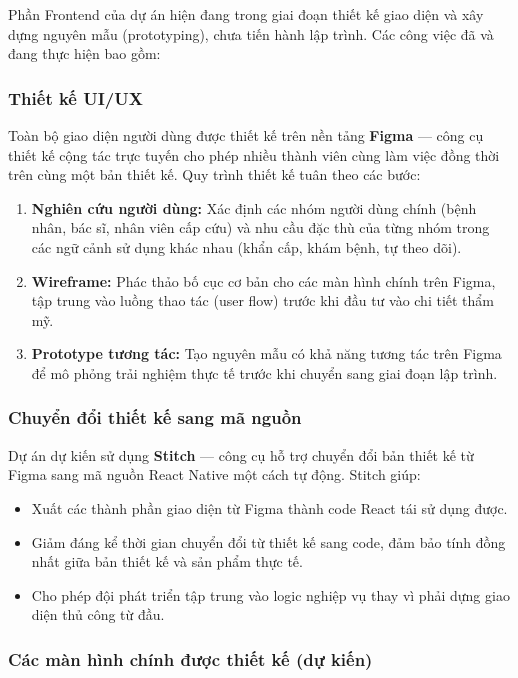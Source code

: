 \documentclass[a4paper,12pt]{article}
\begin{document}
Phần Frontend của dự án hiện đang trong giai đoạn thiết kế giao diện và xây dựng nguyên mẫu (prototyping), chưa tiến hành lập trình. Các công việc đã và đang thực hiện bao gồm:

\subsubsection{Thiết kế UI/UX}

Toàn bộ giao diện người dùng được thiết kế trên nền tảng \textbf{Figma} --- công cụ thiết kế cộng tác trực tuyến cho phép nhiều thành viên cùng làm việc đồng thời trên cùng một bản thiết kế. Quy trình thiết kế tuân theo các bước:

\begin{enumerate}
    \item \textbf{Nghiên cứu người dùng:} Xác định các nhóm người dùng chính (bệnh nhân, bác sĩ, nhân viên cấp cứu) và nhu cầu đặc thù của từng nhóm trong các ngữ cảnh sử dụng khác nhau (khẩn cấp, khám bệnh, tự theo dõi).
    \item \textbf{Wireframe:} Phác thảo bố cục cơ bản cho các màn hình chính trên Figma, tập trung vào luồng thao tác (user flow) trước khi đầu tư vào chi tiết thẩm mỹ.
    \item \textbf{Prototype tương tác:} Tạo nguyên mẫu có khả năng tương tác trên Figma để mô phỏng trải nghiệm thực tế trước khi chuyển sang giai đoạn lập trình.
\end{enumerate}

\subsubsection{Chuyển đổi thiết kế sang mã nguồn}

Dự án dự kiến sử dụng \textbf{Stitch} --- công cụ hỗ trợ chuyển đổi bản thiết kế từ Figma sang mã nguồn React Native một cách tự động. Stitch giúp:

\begin{itemize}
    \item Xuất các thành phần giao diện từ Figma thành code React tái sử dụng được.
    \item Giảm đáng kể thời gian chuyển đổi từ thiết kế sang code, đảm bảo tính đồng nhất giữa bản thiết kế và sản phẩm thực tế.
    \item Cho phép đội phát triển tập trung vào logic nghiệp vụ thay vì phải dựng giao diện thủ công từ đầu.
\end{itemize}

\subsubsection{Các màn hình chính được thiết kế (dự kiến)}
\end{document}
